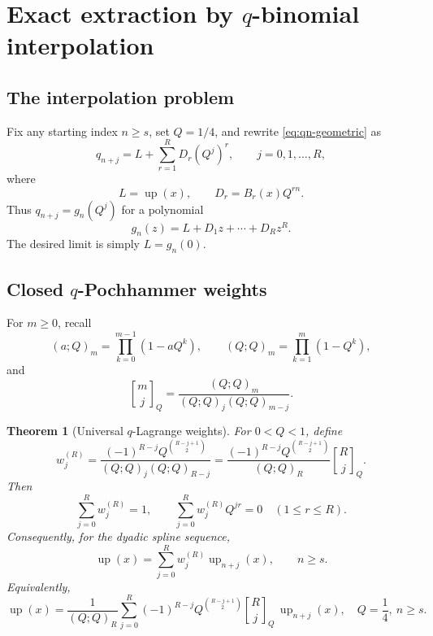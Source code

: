 \documentclass[11pt]{article}
\newtheorem{theorem}{Theorem}[section]
\theoremstyle{definition}
\theoremstyle{remark}
\newcommand{\rv}{\operatorname{up}}
\newcommand{\qbinom}[3]{\genfrac{[}{]}{0pt}{}{#1}{#2}_{#3}}
\begin{document}
\section{Exact extraction by \texorpdfstring{\(q\)}{q}-binomial interpolation}

\subsection{The interpolation problem}

Fix any starting index \(n\ge s\), set \(Q=1/4\), and rewrite
\cref{eq:qn-geometric} as
\begin{equation}
 q_{n+j}=L+\sum_{r=1}^{R}D_r(Q^j)^r,
 \qquad j=0,1,\ldots,R,
 \label{eq:scaled-interpolation-data}
\end{equation}
where
\begin{equation}
 L=\rv(x),\qquad D_r=B_r(x)Q^{rn}.
 \label{eq:D-r}
\end{equation}
Thus \(q_{n+j}=g_n(Q^j)\) for a polynomial
\begin{equation}
 g_n(z)=L+D_1z+\cdots+D_Rz^R.
 \label{eq:g-polynomial}
\end{equation}
The desired limit is simply \(L=g_n(0)\).

\subsection{Closed \texorpdfstring{\(q\)}{q}-Pochhammer weights}

For \(m\ge0\), recall
\begin{equation}
 (a;Q)_m=\prod_{k=0}^{m-1}(1-aQ^k),
 \qquad (Q;Q)_m=\prod_{k=1}^{m}(1-Q^k),
 \label{eq:q-Pochhammer}
\end{equation}
and
\begin{equation}
 \qbinom{m}{j}{Q}=\frac{(Q;Q)_m}
 {(Q;Q)_j(Q;Q)_{m-j}}.
 \label{eq:Gaussian-binomial}
\end{equation}

\begin{theorem}[Universal \(q\)-Lagrange weights]
\label{thm:q-weights}
For \(0<Q<1\), define
\begin{equation}
 w_j^{(R)}=
 \frac{(-1)^{R-j}Q^{\binom{R-j+1}{2}}}
 {(Q;Q)_j(Q;Q)_{R-j}}
 =\frac{(-1)^{R-j}Q^{\binom{R-j+1}{2}}}{(Q;Q)_R}
 \qbinom{R}{j}{Q}.
 \label{eq:q-weights}
\end{equation}
Then
\begin{equation}
 \sum_{j=0}^{R}w_j^{(R)}=1,
 \qquad
 \sum_{j=0}^{R}w_j^{(R)}Q^{jr}=0
 \quad(1\le r\le R).
 \label{eq:weight-moments}
\end{equation}
Consequently, for the dyadic spline sequence,
\begin{equation}
 \boxed{
 \rv(x)=\sum_{j=0}^{R}w_j^{(R)}\rv_{n+j}(x),
 \qquad n\ge s.}
 \label{eq:weighted-extraction}
\end{equation}
Equivalently,
\begin{equation}
 \boxed{
 \rv(x)=\frac{1}{(Q;Q)_R}
 \sum_{j=0}^{R}(-1)^{R-j}Q^{\binom{R-j+1}{2}}
 \qbinom{R}{j}{Q}\,\rv_{n+j}(x),
 \quad Q=\frac14,\ n\ge s.}
 \label{eq:main-extraction}
\end{equation}
\end{theorem}
\end{document}
